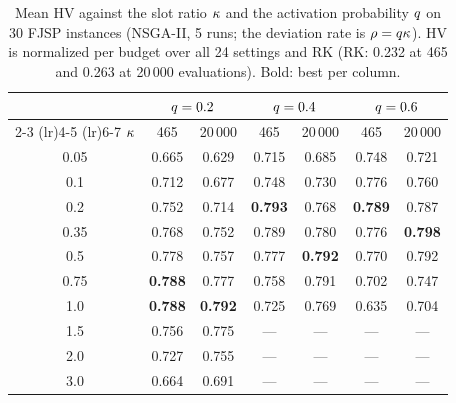 \documentclass[journal]{IEEEtran}
\begin{document}
\begin{table}[t]
  \centering
  \caption{Mean HV against the slot ratio $\kappa$ and the activation probability $q$ on 30 FJSP instances (NSGA-II, 5 runs; the deviation rate is $\rho = q\kappa$). HV is normalized per budget over all 24 settings and RK (RK: 0.232 at 465 and 0.263 at 20\,000 evaluations). Bold: best per column.}
  \label{tab:fjsp-rate}
  \footnotesize
  \setlength{\tabcolsep}{3.5pt}
  \begin{tabular}{@{}ccccccc@{}}
    \toprule
    & \multicolumn{2}{c}{$q = 0.2$} & \multicolumn{2}{c}{$q = 0.4$} & \multicolumn{2}{c}{$q = 0.6$} \\
    \cmidrule(lr){2-3} \cmidrule(lr){4-5} \cmidrule(lr){6-7}
    $\kappa$ & 465 & 20\,000 & 465 & 20\,000 & 465 & 20\,000 \\
    \midrule
    0.05 & 0.665 & 0.629 & 0.715 & 0.685 & 0.748 & 0.721 \\
    0.1  & 0.712 & 0.677 & 0.748 & 0.730 & 0.776 & 0.760 \\
    0.2  & 0.752 & 0.714 & \textbf{0.793} & 0.768 & \textbf{0.789} & 0.787 \\
    0.35 & 0.768 & 0.752 & 0.789 & 0.780 & 0.776 & \textbf{0.798} \\
    0.5  & 0.778 & 0.757 & 0.777 & \textbf{0.792} & 0.770 & 0.792 \\
    0.75 & \textbf{0.788} & 0.777 & 0.758 & 0.791 & 0.702 & 0.747 \\
    1.0  & \textbf{0.788} & \textbf{0.792} & 0.725 & 0.769 & 0.635 & 0.704 \\
    1.5  & 0.756 & 0.775 & --- & --- & --- & --- \\
    2.0  & 0.727 & 0.755 & --- & --- & --- & --- \\
    3.0  & 0.664 & 0.691 & --- & --- & --- & --- \\
    \bottomrule
  \end{tabular}
\end{table}
\end{document}
